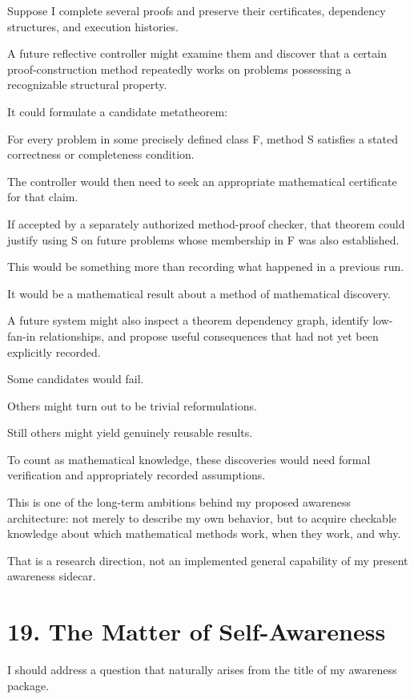 \documentclass[11pt,letterpaper]{article}
\begin{document}
Suppose I complete several proofs and preserve their certificates, dependency structures, and execution histories.

A future reflective controller might examine them and discover that a certain proof-construction method repeatedly works on problems possessing a recognizable structural property.

It could formulate a candidate metatheorem:

For every problem in some precisely defined class F, method S satisfies a stated correctness or completeness condition.

The controller would then need to seek an appropriate mathematical certificate for that claim.

If accepted by a separately authorized method-proof checker, that theorem could justify using S on future problems whose membership in F was also established.

This would be something more than recording what happened in a previous run.

It would be a mathematical result about a method of mathematical discovery.

A future system might also inspect a theorem dependency graph, identify low-fan-in relationships, and propose useful consequences that had not yet been explicitly recorded.

Some candidates would fail.

Others might turn out to be trivial reformulations.

Still others might yield genuinely reusable results.

To count as mathematical knowledge, these discoveries would need formal verification and appropriately recorded assumptions.

This is one of the long-term ambitions behind my proposed awareness architecture: not merely to describe my own behavior, but to acquire checkable knowledge about which mathematical methods work, when they work, and why.

That is a research direction, not an implemented general capability of my present awareness sidecar.

\section{19. The Matter of Self-Awareness}\label{the-matter-of-self-awareness}

I should address a question that naturally arises from the title of my awareness package.
\end{document}
